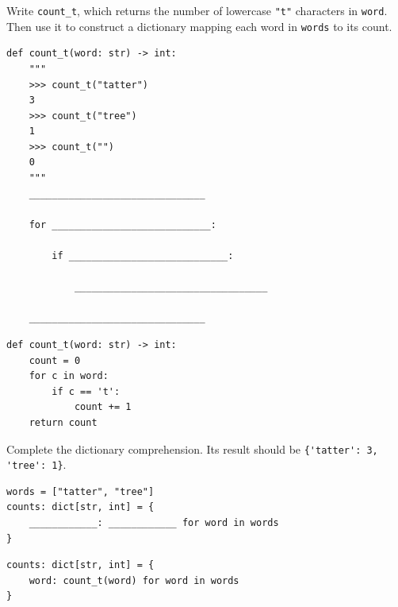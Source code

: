 \begin{blocksection}
\question Write \lstinline{count_t}, which returns the number of lowercase
\lstinline{"t"} characters in \lstinline{word}. Then use it to construct a
dictionary mapping each word in \lstinline{words} to its count.

\begin{lstlisting}
def count_t(word: str) -> int:
    """
    >>> count_t("tatter")
    3
    >>> count_t("tree")
    1
    >>> count_t("")
    0
    """
    _______________________________

    for ____________________________:

        if ____________________________:

            __________________________________

    _______________________________
\end{lstlisting}
\begin{solution}
\begin{lstlisting}
def count_t(word: str) -> int:
    count = 0
    for c in word:
        if c == 't':
            count += 1
    return count
\end{lstlisting}
\end{solution}
\end{blocksection}

\begin{blocksection}
Complete the dictionary comprehension. Its result should be
\lstinline|{'tatter': 3, 'tree': 1}|.

\begin{lstlisting}
words = ["tatter", "tree"]
counts: dict[str, int] = {
    ____________: ____________ for word in words
}
\end{lstlisting}
\begin{solution}
\begin{lstlisting}
counts: dict[str, int] = {
    word: count_t(word) for word in words
}
\end{lstlisting}
\end{solution}
\end{blocksection}

